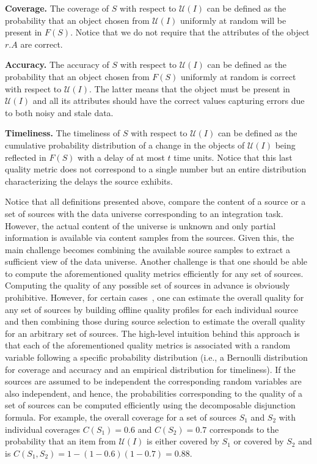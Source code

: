 \documentclass{sig-alternate}
\begin{document}
\vspace{5pt}\noindent\textbf{Coverage.} The coverage of $S$ with respect to $\mathcal{U}(I)$ can be defined as the probability that an object chosen from $\mathcal{U}(I)$ uniformly at random will be present in $F(S)$. Notice that we do not require that the attributes of the object $r.A$ are correct.

\vspace{5pt}\noindent\textbf{Accuracy.} The accuracy of $S$ with respect to $\mathcal{U}(I)$ can be defined as the probability that an object chosen from $F(S)$ uniformly at random is correct with respect to $\mathcal{U}(I)$. The latter means that the object must be present in $\mathcal{U}(I)$ and all its attributes should have the correct values capturing errors due to both noisy and stale data.

\vspace{5pt}\noindent\textbf{Timeliness.} The timeliness of $S$ with respect to $\mathcal{U}(I)$ can be defined as the cumulative probability distribution of a change in the objects of $\mathcal{U}(I)$ being reflected in $F(S)$ with a delay of at most $t$ time units. Notice that this last quality metric does not correspond to a single number but an entire distribution characterizing the delays the source exhibits.

\vspace{5pt}Notice that all definitions presented above, compare the content of a source or a set of sources with the data universe corresponding to an integration task. However, the actual content of the universe is unknown and only partial information is available via content samples from the sources. Given this, the main challenge becomes combining the available source samples to extract a sufficient view of the data universe. Another challenge is that one should be able to compute the aforementioned quality metrics efficiently for any set of sources. Computing the quality of any possible set of sources in advance is obviously prohibitive. However, for certain cases~\cite{dong:vldb13,rekatsinas:2014}, one can estimate the overall quality for any set of sources by building offline quality profiles for each individual source and then combining those during source selection to estimate the overall quality for an arbitrary set of sources. The high-level intuition behind this approach is that each of the aforementioned quality metrics is associated with a random variable following a specific probability distribution (i.e., a Bernoulli distribution for coverage and accuracy and an empirical distribution for timeliness). If the sources are assumed to be independent the corresponding random variables are also independent, and hence, the probabilities corresponding to the quality of a set of sources can be computed efficiently using the decomposable disjunction formula. For example, the overall coverage for a set of sources $S_1$ and $S_2$ with individual coverages $C(S_1) = 0.6$ and $C(S_2) = 0.7$ corresponds to the probability that an item from $\mathcal{U}(I)$ is either covered by $S_1$ or covered by $S_2$ and is $C(S_1,S_2) = 1 - (1-0.6)(1-0.7) = 0.88$.
\end{document}
